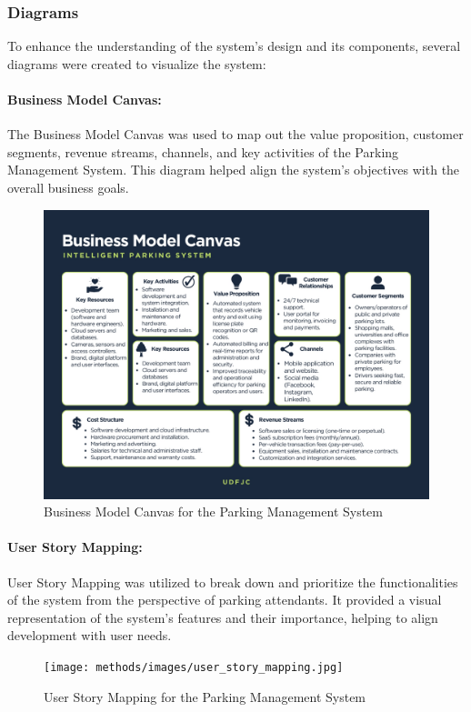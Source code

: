 \subsubsection{Diagrams}

To enhance the understanding of the system’s design and its components, several diagrams were created to visualize the system:

\paragraph{Business Model Canvas:}
The Business Model Canvas was used to map out the value proposition, customer segments, revenue streams, channels, and key activities of the Parking Management System. This diagram helped align the system’s objectives with the overall business goals.

\begin{figure}[ht]
    \centering
    \includegraphics[width=0.8\linewidth]{methods/images/Business_Model_Canvas.jpg}
    \caption{Business Model Canvas for the Parking Management System}
\end{figure}

\paragraph{User Story Mapping:}
User Story Mapping was utilized to break down and prioritize the functionalities of the system from the perspective of parking attendants. It provided a visual representation of the system's features and their importance, helping to align development with user needs.

\begin{figure}[ht]
    \centering
    \texttt{[image: methods/images/user\_story\_mapping.jpg]}
    \caption{User Story Mapping for the Parking Management System}
\end{figure}

